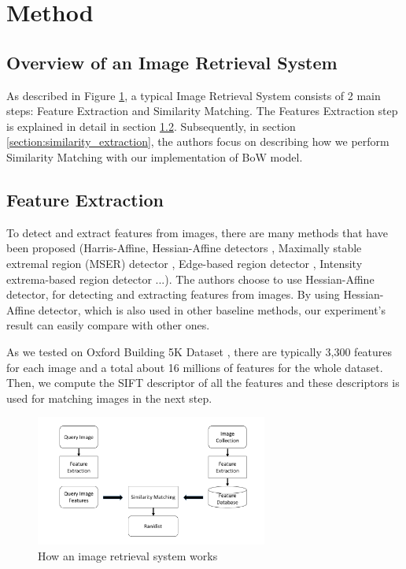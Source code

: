 % 

\section{Method} \label{section:method}
\subsection{Overview of an Image Retrieval System}

As described in Figure \ref{fig:image_retrieval_system}, a typical Image Retrieval System consists of 2 main steps: Feature Extraction and Similarity Matching. The Features Extraction step is explained in detail in section \ref{section:feature_extraction}. Subsequently, in section \ref{section:similarity_extraction}, the authors focus on describing how we perform Similarity Matching with our implementation of BoW model.


\subsection{Feature Extraction} \label{section:feature_extraction}

To detect and extract features from images, there are many methods that have been proposed (Harris-Affine, Hessian-Affine detectors \cite{Mikolajczyk2004}, Maximally stable extremal region (MSER) detector \cite{conf/bmvc/MatasCUP02}, Edge-based region detector \cite{Tuytelaars99content-basedimage}, Intensity extrema-based region detector \cite{Tuytelaars00widebaseline} ...). The authors choose to use Hessian-Affine detector, for detecting and extracting features from images. By using Hessian-Affine detector, which is also used in other baseline methods, our experiment's result can easily compare with other ones.

As we tested on Oxford Building 5K Dataset \cite{oxbuilding}, there are typically 3,300 features for each image and a total about 16 millions of features for the whole dataset. Then, we compute the SIFT descriptor \cite{Lowe2004} of all the features and these descriptors is used for matching images in the next step.

\begin{figure}
    \centering
    \includegraphics[width=3.0in]{ImageRetrievalSystem.pdf}
    \caption{How an image retrieval system works}
    \label{fig:image_retrieval_system}
\end{figure}

